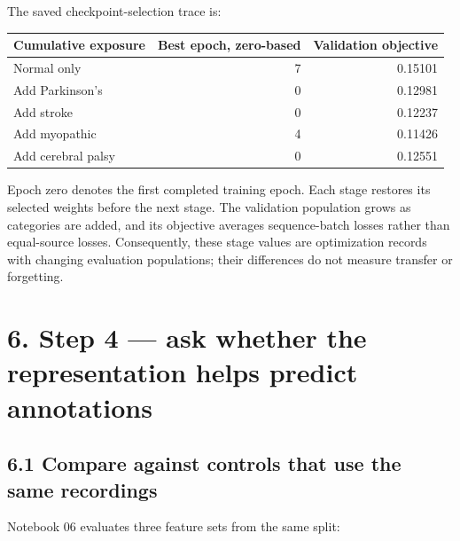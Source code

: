 \documentclass[11pt,letterpaper]{article}
\newcounter{none}
\begin{document}
The saved checkpoint-selection trace is:

\begin{minipage}{\linewidth}

{\def\LTcaptype{none} %
\begin{longtable}[]{@{}lrr@{}}
\toprule\noalign{}
Cumulative exposure & Best epoch, zero-based & Validation objective \\
\midrule\noalign{}
\endhead
\bottomrule\noalign{}
\endlastfoot
Normal only & 7 & 0.15101 \\
Add Parkinson's & 0 & 0.12981 \\
Add stroke & 0 & 0.12237 \\
Add myopathic & 4 & 0.11426 \\
Add cerebral palsy & 0 & 0.12551 \\
\end{longtable}
}

\end{minipage}

Epoch zero denotes the first completed training epoch. Each stage
restores its selected weights before the next stage. The validation
population grows as categories are added, and its objective averages
sequence-batch losses rather than equal-source losses. Consequently,
these stage values are optimization records with changing evaluation
populations; their differences do not measure transfer or forgetting.

\section{6. Step 4 --- ask whether the representation helps predict
annotations}\label{step-4-ask-whether-the-representation-helps-predict-annotations}

\subsection{6.1 Compare against controls that use the same
recordings}\label{compare-against-controls-that-use-the-same-recordings}

Notebook 06 evaluates three feature sets from the same split:
\end{document}
